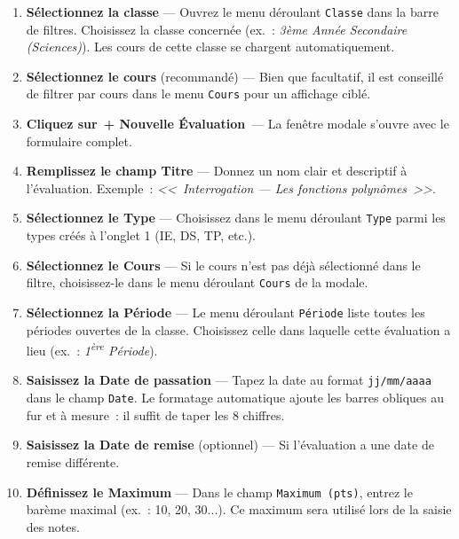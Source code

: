 \documentclass[12pt,a4paper]{report}
\newcommand{\champ}[1]{\texttt{\color{violet}#1}}
\newcommand{\bouton}[1]{{\colorbox{emerald}{\small\sffamily\bfseries\color{white}\,#1\,}}}
\begin{document}
\begin{etape}[title=Procédure détaillée : Créer une évaluation]
\begin{enumerate}[leftmargin=1.5cm,label=\textbf{\arabic*.},itemsep=12pt]
  \item \textbf{Sélectionnez la classe} — Ouvrez le menu déroulant \champ{Classe} dans la barre de filtres. Choisissez la classe concernée (ex.\ : \textit{3ème Année Secondaire (Sciences)}). Les cours de cette classe se chargent automatiquement.

  \item \textbf{Sélectionnez le cours} (recommandé) — Bien que facultatif, il est conseillé de filtrer par cours dans le menu \champ{Cours} pour un affichage ciblé.

  \item \textbf{Cliquez sur} \bouton{+ Nouvelle Évaluation} — La fenêtre modale s'ouvre avec le formulaire complet.

  \item \textbf{Remplissez le champ Titre} — Donnez un nom clair et descriptif à l'évaluation. Exemple~: \textit{<<~Interrogation — Les fonctions polynômes~>>}.

  \item \textbf{Sélectionnez le Type} — Choisissez dans le menu déroulant \champ{Type} parmi les types créés à l'onglet 1 (IE, DS, TP, etc.).

  \item \textbf{Sélectionnez le Cours} — Si le cours n'est pas déjà sélectionné dans le filtre, choisissez-le dans le menu déroulant \champ{Cours} de la modale.

  \item \textbf{Sélectionnez la Période} — Le menu déroulant \champ{Période} liste toutes les périodes ouvertes de la classe. Choisissez celle dans laquelle cette évaluation a lieu (ex.\ : \textit{1\textsuperscript{ère} Période}).

  \item \textbf{Saisissez la Date de passation} — Tapez la date au format \texttt{jj/mm/aaaa} dans le champ \champ{Date}. Le formatage automatique ajoute les barres obliques au fur et à mesure~: il suffit de taper les 8 chiffres.

  \item \textbf{Saisissez la Date de remise} (optionnel) — Si l'évaluation a une date de remise différente.

  \item \textbf{Définissez le Maximum} — Dans le champ \champ{Maximum (pts)}, entrez le barème maximal (ex.\ : 10, 20, 30...). Ce maximum sera utilisé lors de la saisie des notes.


\end{enumerate}
\end{etape}
\end{document}
